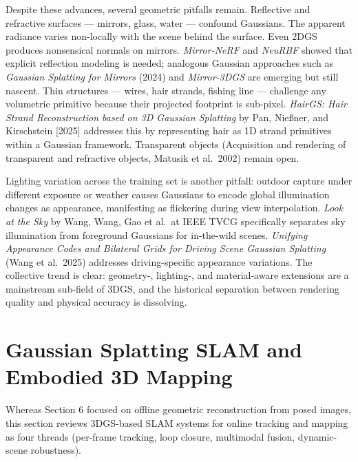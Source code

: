 \documentclass{article}
\begin{document}
Despite these advances, several geometric pitfalls remain. Reflective and refractive surfaces --- mirrors, glass, water --- confound Gaussians. The apparent radiance varies non-locally with the scene behind the surface. Even 2DGS produces nonsensical normals on mirrors. \emph{Mirror-NeRF} and \emph{NeuRBF} showed that explicit reflection modeling is needed; analogous Gaussian approaches such as \emph{Gaussian Splatting for Mirrors} (2024) and \emph{Mirror-3DGS} are emerging but still nascent. Thin structures --- wires, hair strands, fishing line --- challenge any volumetric primitive because their projected footprint is sub-pixel. \emph{HairGS: Hair Strand Reconstruction based on 3D Gaussian Splatting} by Pan, Nießner, and Kirschstein {[}2025{]} addresses this by representing hair as 1D strand primitives within a Gaussian framework. Transparent objects (Acquisition and rendering of transparent and refractive objects, Matusik et al.~2002) remain open.

Lighting variation across the training set is another pitfall: outdoor capture under different exposure or weather causes Gaussians to encode global illumination changes as appearance, manifesting as flickering during view interpolation. \emph{Look at the Sky} by Wang, Wang, Gao et al.~at IEEE TVCG \cite{wang2025lookattheskyskyawa} specifically separates sky illumination from foreground Gaussians for in-the-wild scenes. \emph{Unifying Appearance Codes and Bilateral Grids for Driving Scene Gaussian Splatting} (Wang et al.~2025) addresses driving-specific appearance variations. The collective trend is clear: geometry-, lighting-, and material-aware extensions are a mainstream sub-field of 3DGS, and the historical separation between rendering quality and physical accuracy is dissolving.

\section{Gaussian Splatting SLAM and Embodied 3D Mapping}\label{gaussian-splatting-slam-and-embodied-3d-mapping}

Whereas Section 6 focused on offline geometric reconstruction from posed images, this section reviews 3DGS-based SLAM systems for online tracking and mapping as four threads (per-frame tracking, loop closure, multimodal fusion, dynamic-scene robustness).
\end{document}
